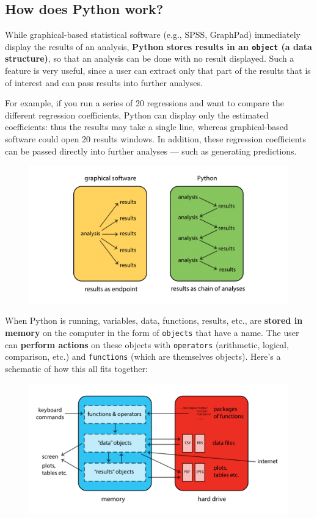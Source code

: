 \documentclass[]{book}
\begin{document}
\subsection{How does Python work?}\label{how-does-python-work}

While graphical-based statistical software (e.g., SPSS, GraphPad)
immediately display the results of an analysis, \textbf{Python stores
results in an \texttt{object} (a data structure)}, so that an analysis
can be done with no result displayed. Such a feature is very useful,
since a user can extract only that part of the results that is of
interest and can pass results into further analyses.

For example, if you run a series of 20 regressions and want to compare
the different regression coefficients, Python can display only the
estimated coefficients: thus the results may take a single line, whereas
graphical-based software could open 20 results windows. In addition,
these regression coefficients can be passed directly into further
analyses --- such as generating predictions.

\begin{figure}
\centering
\includegraphics{Python/PythonIntro/images/python_chain.png}
\caption{}
\end{figure}

When Python is running, variables, data, functions, results, etc., are
\textbf{stored in memory} on the computer in the form of
\texttt{objects} that have a name. The user can \textbf{perform actions}
on these objects with \texttt{operators} (arithmetic, logical,
comparison, etc.) and \texttt{functions} (which are themselves objects).
Here's a schematic of how this all fits together:

\begin{figure}
\centering
\includegraphics{Python/PythonIntro/images/python_works.png}
\caption{}
\end{figure}
\end{document}
